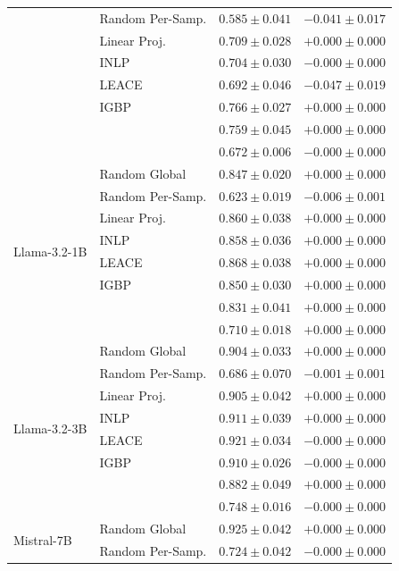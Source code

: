 \begin{longtable}{ll rr}
   & Random Per-Samp. & $0.585{\pm}0.041$ & $-0.041{\pm}0.017$ \\
   & Linear Proj. & $0.709{\pm}0.028$ & $+0.000{\pm}0.000$ \\
   & INLP & $0.704{\pm}0.030$ & $-0.000{\pm}0.000$ \\
   & LEACE & $0.692{\pm}0.046$ & $-0.047{\pm}0.019$ \\
   & IGBP & $0.766{\pm}0.027$ & $+0.000{\pm}0.000$ \\
   & \AmbGCE{} & $0.759{\pm}0.045$ & $+0.000{\pm}0.000$ \\
   & \TanGCE{} & \textbf{$0.672{\pm}0.006$} & $-0.000{\pm}0.000$ \\
  \midrule
  \multirow{8}{*}{Llama-3.2-1B} & Random Global & $0.847{\pm}0.020$ & $+0.000{\pm}0.000$ \\
   & Random Per-Samp. & $0.623{\pm}0.019$ & $-0.006{\pm}0.001$ \\
   & Linear Proj. & $0.860{\pm}0.038$ & $+0.000{\pm}0.000$ \\
   & INLP & $0.858{\pm}0.036$ & $+0.000{\pm}0.000$ \\
   & LEACE & $0.868{\pm}0.038$ & $+0.000{\pm}0.000$ \\
   & IGBP & $0.850{\pm}0.030$ & $+0.000{\pm}0.000$ \\
   & \AmbGCE{} & $0.831{\pm}0.041$ & $+0.000{\pm}0.000$ \\
   & \TanGCE{} & \textbf{$0.710{\pm}0.018$} & $+0.000{\pm}0.000$ \\
  \midrule
  \multirow{8}{*}{Llama-3.2-3B} & Random Global & $0.904{\pm}0.033$ & $+0.000{\pm}0.000$ \\
   & Random Per-Samp. & $0.686{\pm}0.070$ & $-0.001{\pm}0.001$ \\
   & Linear Proj. & $0.905{\pm}0.042$ & $+0.000{\pm}0.000$ \\
   & INLP & $0.911{\pm}0.039$ & $+0.000{\pm}0.000$ \\
   & LEACE & $0.921{\pm}0.034$ & $-0.000{\pm}0.000$ \\
   & IGBP & $0.910{\pm}0.026$ & $-0.000{\pm}0.000$ \\
   & \AmbGCE{} & $0.882{\pm}0.049$ & $+0.000{\pm}0.000$ \\
   & \TanGCE{} & \textbf{$0.748{\pm}0.016$} & $-0.000{\pm}0.000$ \\
  \midrule
  \multirow{8}{*}{Mistral-7B} & Random Global & $0.925{\pm}0.042$ & $+0.000{\pm}0.000$ \\
   & Random Per-Samp. & $0.724{\pm}0.042$ & $-0.000{\pm}0.000$ \\

\end{longtable}
